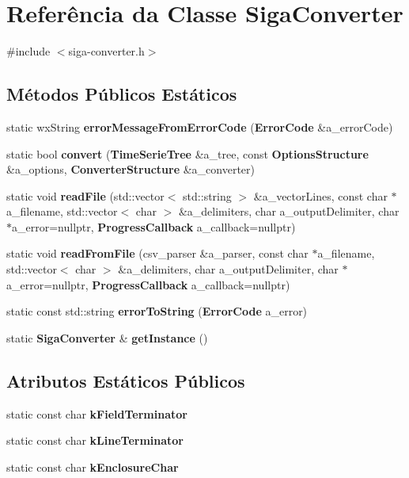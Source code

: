 \section{Referência da Classe Siga\+Converter}
\label{class_siga_converter}


{\ttfamily \#include $<$siga-\/converter.\+h$>$}

\subsection*{Métodos Públicos Estáticos}
\begin{DoxyCompactItemize}
\item 
static wx\+String {\bf error\+Message\+From\+Error\+Code} ({\bf Error\+Code} \&a\+\_\+error\+Code)
\item 
static bool {\bf convert} ({\bf Time\+Serie\+Tree} \&a\+\_\+tree, const {\bf Options\+Structure} \&a\+\_\+options, {\bf Converter\+Structure} \&a\+\_\+converter)
\item 
static void {\bf read\+File} (std\+::vector$<$ std\+::string $>$ \&a\+\_\+vector\+Lines, const char $\ast$a\+\_\+filename, std\+::vector$<$ char $>$ \&a\+\_\+delimiters, char a\+\_\+output\+Delimiter, char $\ast$a\+\_\+error=nullptr, {\bf Progress\+Callback} a\+\_\+callback=nullptr)
\item 
static void {\bf read\+From\+File} (csv\+\_\+parser \&a\+\_\+parser, const char $\ast$a\+\_\+filename, std\+::vector$<$ char $>$ \&a\+\_\+delimiters, char a\+\_\+output\+Delimiter, char $\ast$a\+\_\+error=nullptr, {\bf Progress\+Callback} a\+\_\+callback=nullptr)
\item 
static const std\+::string {\bf error\+To\+String} ({\bf Error\+Code} a\+\_\+error)
\item 
static {\bf Siga\+Converter} \& {\bf get\+Instance} ()
\end{DoxyCompactItemize}
\subsection*{Atributos Estáticos Públicos}
\begin{DoxyCompactItemize}
\item 
static const char {\bf k\+Field\+Terminator}
\item 
static const char {\bf k\+Line\+Terminator}
\item 
static const char {\bf k\+Enclosure\+Char}
\end{DoxyCompactItemize}


